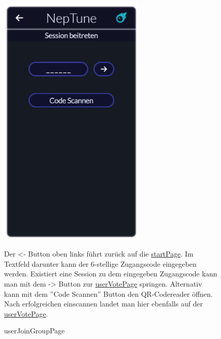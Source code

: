 \documentclass[oneside, ngerman]{sdqtechreport}
\begin{document}
\begin{figure}
    \hypertarget{userJoinGroupPage}{}
    \begin{minipage}[t]{7 cm}
        \vspace{-1.5ex}
        \includegraphics[width=7cm]{LATEX/Pflichtenheft/GraphicDesigns/userJoinGroupPage.png}
        \caption{userJoinGroupPage}
    \end{minipage}
    \hspace{1cm}
    \begin{minipage}[t]{7 cm}
        \vspace{1cm}
         Der <- Button oben links führt zurück auf die \hyperlink{startPage}{startPage}.
         Im Textfeld darunter kann der 6-stellige Zugangscode eingegeben werden. Existiert eine Session zu dem eingegeben Zugangscode kann man mit dem -> Button zur
         \hyperlink{userVotePage}{userVotePage} springen. Alternativ kann mit dem ''Code Scannen'' Button den QR-Codereader öffnen. Nach erfolgreichen einscannen landet man hier ebenfalls auf der \hyperlink{userVotePage}{userVotePage}. 
         
    \end{minipage}
\end{figure}
\end{document}
